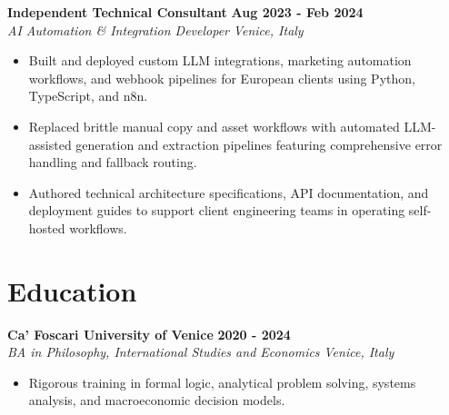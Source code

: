 \documentclass[10pt,a4paper]{article}
\newcommand{\role}[4]{%
  \textbf{#1} \hfill \textbf{#2}\\[1pt]%
  \textit{#3} \hfill \textit{#4}\\[2pt]%
}
\begin{document}
\role{Independent Technical Consultant}{Aug 2023 - Feb 2024}{AI Automation \& Integration Developer}{Venice, Italy}
\begin{itemize}
  \item Built and deployed custom LLM integrations, marketing automation workflows, and webhook pipelines for European clients using Python, TypeScript, and n8n.
  \item Replaced brittle manual copy and asset workflows with automated LLM-assisted generation and extraction pipelines featuring comprehensive error handling and fallback routing.
  \item Authored technical architecture specifications, API documentation, and deployment guides to support client engineering teams in operating self-hosted workflows.
\end{itemize}

\section{Education}
\role{Ca' Foscari University of Venice}{2020 - 2024}{BA in Philosophy, International Studies and Economics}{Venice, Italy}
\begin{itemize}
  \item Rigorous training in formal logic, analytical problem solving, systems analysis, and macroeconomic decision models.
\end{itemize}
\end{document}
